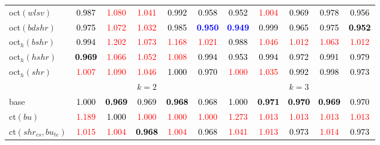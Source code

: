 \begin{tabular}[t]{l|>{}cccc>{}c|ccccc}
oct$(wlsv)$ & \textcolor{black}{0.987} & \textcolor{red}{1.080} & \textcolor{red}{1.041} & \textcolor{black}{0.992} & \textcolor{black}{0.958} & \textcolor{black}{0.952} & \textcolor{red}{1.004} & \textcolor{black}{0.969} & \textcolor{black}{0.978} & \textcolor{black}{0.956}\\
oct$(bdshr)$ & \textcolor{black}{0.975} & \textcolor{red}{1.072} & \textcolor{red}{1.032} & \textcolor{black}{0.985} & \textcolor{blue}{\textbf{0.950}} & \textcolor{blue}{\textbf{0.949}} & \textcolor{black}{0.999} & \textcolor{black}{0.965} & \textcolor{black}{0.975} & \textcolor{black}{\textbf{0.952}}\\
oct$_h(bshr)$ & \textcolor{black}{0.994} & \textcolor{red}{1.202} & \textcolor{red}{1.073} & \textcolor{red}{1.168} & \textcolor{red}{1.021} & \textcolor{black}{0.988} & \textcolor{red}{1.046} & \textcolor{red}{1.012} & \textcolor{red}{1.063} & \textcolor{red}{1.012}\\
oct$_h(hshr)$ & \textcolor{black}{\textbf{0.969}} & \textcolor{red}{1.066} & \textcolor{red}{1.052} & \textcolor{red}{1.008} & \textcolor{black}{0.994} & \textcolor{black}{0.953} & \textcolor{black}{0.994} & \textcolor{black}{0.972} & \textcolor{black}{0.991} & \textcolor{black}{0.979}\\
oct$_h(shr)$ & \textcolor{red}{1.007} & \textcolor{red}{1.090} & \textcolor{red}{1.046} & \textcolor{black}{1.000} & \textcolor{black}{0.970} & \textcolor{red}{1.000} & \textcolor{red}{1.035} & \textcolor{black}{0.992} & \textcolor{black}{0.998} & \textcolor{black}{0.973}\\
\addlinespace[0.3em]
\multicolumn{1}{c}{} & \multicolumn{5}{c}{\textbf{$k = 2$}} & \multicolumn{5}{c}{\textbf{$k = 3$}}\\
base & \textcolor{black}{1.000} & \textcolor{black}{\textbf{0.969}} & \textcolor{black}{0.969} & \textcolor{black}{\textbf{0.968}} & \textcolor{black}{0.968} & \textcolor{black}{1.000} & \textcolor{black}{\textbf{0.971}} & \textcolor{black}{\textbf{0.970}} & \textcolor{black}{\textbf{0.969}} & \textcolor{black}{0.970}\\
ct$(bu)$ & \textcolor{red}{1.189} & \textcolor{black}{1.000} & \textcolor{red}{1.000} & \textcolor{red}{1.000} & \textcolor{red}{1.000} & \textcolor{red}{1.273} & \textcolor{red}{1.013} & \textcolor{red}{1.013} & \textcolor{red}{1.013} & \textcolor{red}{1.013}\\
ct$(shr_{cs}, bu_{te})$ & \textcolor{red}{1.015} & \textcolor{red}{1.004} & \textcolor{black}{\textbf{0.968}} & \textcolor{red}{1.004} & \textcolor{black}{0.968} & \textcolor{red}{1.041} & \textcolor{red}{1.013} & \textcolor{black}{0.973} & \textcolor{red}{1.014} & \textcolor{black}{0.973}\\

\end{tabular}

